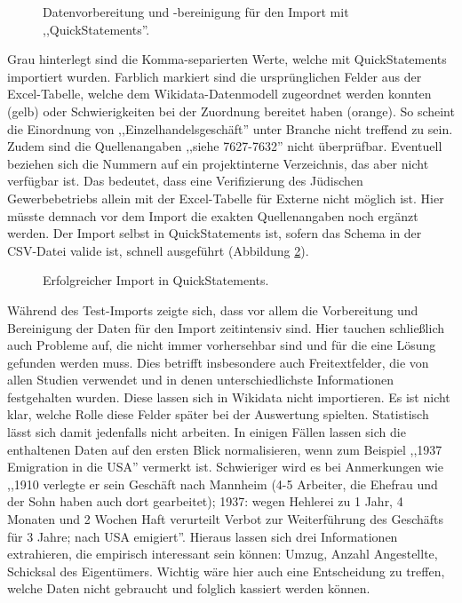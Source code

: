 \begin{figure}[h]
    \centering
    \caption{Datenvorbereitung und -bereinigung für den Import mit ,,QuickStatements''.}
    \label{fig:wikidatacleanup}
\end{figure}

Grau hinterlegt sind die Komma-separierten Werte, welche mit QuickStatements importiert wurden. Farblich markiert sind die ursprünglichen Felder aus der Excel-Tabelle, welche dem Wikidata-Datenmodell zugeordnet werden konnten (gelb) oder Schwierigkeiten bei der Zuordnung bereitet haben (orange). So scheint die Einordnung von ,,Einzelhandelsgeschäft'' unter Branche nicht treffend zu sein. Zudem sind die Quellenangaben ,,siehe 7627-7632'' nicht überprüfbar. Eventuell beziehen sich die Nummern auf ein projektinterne Verzeichnis, das aber nicht verfügbar ist. Das bedeutet, dass eine Verifizierung des Jüdischen Gewerbebetriebs allein mit der Excel-Tabelle für Externe nicht möglich ist. Hier müsste demnach vor dem Import die exakten Quellenangaben noch ergänzt werden. Der Import selbst in QuickStatements ist, sofern das Schema in der CSV-Datei valide ist, schnell ausgeführt (Abbildung \ref{fig:wikidataquickstatements}).

\begin{figure}[h]
    \centering
    \caption{Erfolgreicher Import in QuickStatements.}
    \label{fig:wikidataquickstatements}
\end{figure}

Während des Test-Imports zeigte sich, dass vor allem die Vorbereitung und Bereinigung der Daten für den Import zeitintensiv sind. Hier tauchen schließlich auch Probleme auf, die nicht immer vorhersehbar sind und für die eine Lösung gefunden werden muss. Dies betrifft insbesondere auch Freitextfelder, die von allen Studien verwendet und in denen unterschiedlichste Informationen festgehalten wurden. Diese lassen sich in Wikidata nicht importieren. Es ist nicht klar, welche Rolle diese Felder später bei der Auswertung spielten. Statistisch lässt sich damit jedenfalls nicht arbeiten. In einigen Fällen lassen sich die enthaltenen Daten auf den ersten Blick normalisieren, wenn zum Beispiel ,,1937 Emigration in die USA'' vermerkt ist. Schwieriger wird es bei Anmerkungen wie ,,1910 verlegte er sein Geschäft nach Mannheim (4-5 Arbeiter, die Ehefrau und der Sohn haben auch dort gearbeitet); 1937: wegen Hehlerei zu 1 Jahr, 4 Monaten und 2 Wochen Haft verurteilt Verbot zur Weiterführung des Geschäfts für 3 Jahre; nach USA emigiert''. Hieraus lassen sich drei Informationen extrahieren, die empirisch interessant sein können: Umzug, Anzahl Angestellte, Schicksal des Eigentümers. Wichtig wäre hier auch eine Entscheidung zu treffen, welche Daten nicht gebraucht und folglich kassiert werden können.

